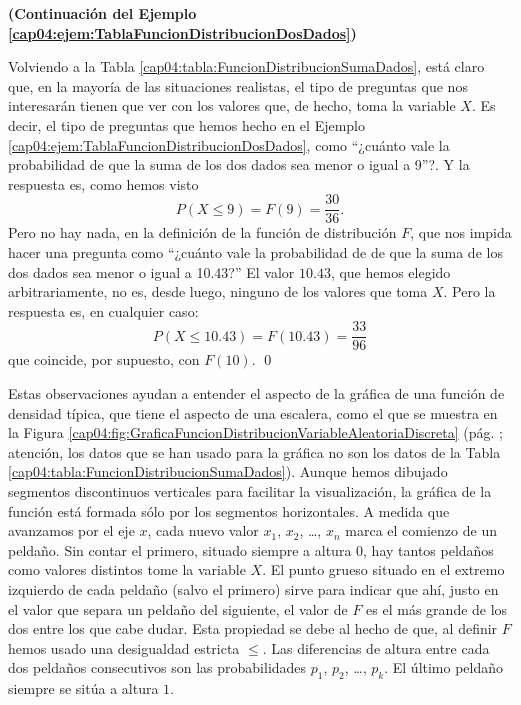 \begin{ejemplo}
{\bf (Continuación del Ejemplo \ref{cap04:ejem:TablaFuncionDistribucionDosDados})}
\label{cap04:ejem:TablaFuncionDistribucionDosDados02}

Volviendo a la Tabla \ref{cap04:tabla:FuncionDistribucionSumaDados}, está claro que, en la mayoría
de las situaciones realistas, el tipo de preguntas que nos interesarán tienen que ver con los
valores que, de hecho, toma la variable $X$. Es decir, el tipo de preguntas  que hemos hecho en el
Ejemplo \ref{cap04:ejem:TablaFuncionDistribucionDosDados}, como ``¿cuánto vale la probabilidad de
que la suma de los dos dados sea menor o igual a 9''?. Y la respuesta es, como hemos visto
\[P(X\leq 9)=F(9)=\dfrac{30}{36}.\]
Pero no hay nada, en la definición de la función de distribución $F$, que nos impida hacer una pregunta como ``¿cuánto vale la probabilidad de de que la suma de los dos dados sea menor o igual a 10.43?''
El valor $10.43$, que hemos elegido arbitrariamente, no es, desde luego, ninguno de los valores que toma $X$. Pero la respuesta  es, en cualquier caso:
\[P(X\leq 10.43)=F(10.43)=\dfrac{33}{96}\]
que coincide, por supuesto, con $F(10)$.
\qed
\end{ejemplo}
Estas observaciones ayudan a entender el aspecto de la gráfica de una función de densidad típica,
que tiene el aspecto de una escalera, como el que se muestra en la Figura
\ref{cap04:fig:GraficaFuncionDistribucionVariableAleatoriaDiscreta} (pág.
\pageref{cap04:fig:GraficaFuncionDistribucionVariableAleatoriaDiscreta}; atención, los datos que se
han usado para la gráfica no son los datos de la Tabla
\ref{cap04:tabla:FuncionDistribucionSumaDados}). Aunque hemos
dibujado segmentos discontinuos verticales para facilitar la visualización, la gráfica de la
función está formada sólo por los segmentos horizontales. A medida que avanzamos por el eje $x$,
cada nuevo valor $x_1$, $x_2$, \ldots, $x_n$ marca el comienzo de un peldaño. Sin contar el
primero, situado siempre a altura $0$,  hay tantos peldaños como valores distintos tome la variable
$X$. El punto grueso situado en el extremo izquierdo de cada peldaño (salvo el primero) sirve para
indicar que ahí, justo en el valor que separa un peldaño del siguiente, el valor de $F$ es el más
grande de los dos entre los que cabe dudar. Esta propiedad se debe al hecho de que, al definir $F$
hemos usado una desigualdad estricta $\leq$. Las diferencias de altura entre cada dos peldaños
consecutivos son las probabilidades $p_1$, $p_2$, \ldots, $p_k$. El último peldaño siempre se sitúa
a altura $1$.

